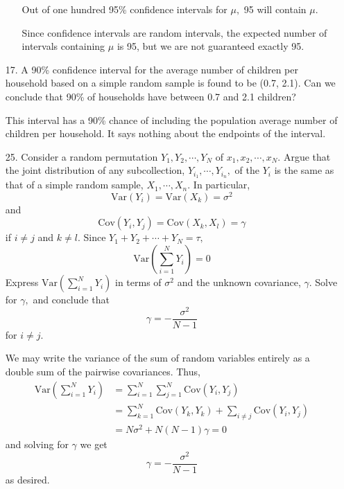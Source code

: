 \documentclass{article}
\newcommand{\var}{\mathrm{Var}}
\newcommand{\cov}{\mathrm{Cov}}
\begin{document}
\begin{itemize}
\begin{enumerate}[a.]
			\ii Out of one hundred 95\% confidence intervals for $\mu,$ 95 will contain $\mu.$
			\begin{answer*}
				 Since confidence intervals are random intervals, the expected number of intervals containing $\mu$ is 95, but we are not guaranteed exactly 95.
			\end{answer*}
		\end{enumerate}

	\item[17.] A 90\% confidence interval for the average number of children per household based on a simple random sample is found to be (0.7, 2.1). Can we conclude that 90\% of households have between 0.7 and 2.1 children?
		\begin{answer*}
			 This interval has a 90\% chance of including the population average number of children per household. It says nothing about the endpoints of the interval.
		\end{answer*}


	\newpage

	\item[25.] Consider a random permutation $Y_1, Y_2, \cdots, Y_N$ of $x_1, x_2, \cdots, x_N.$ Argue that the joint distribution of any subcollection, $Y_{i_1}, \cdots, Y_{i_n},$ of the $Y_i$ is the same as that of a simple random sample, $X_1,\cdots, X_n.$ In particular, \[\var(Y_i)=\var(X_k) = \sigma^2\] and \[\cov(Y_i, Y_j)=\cov(X_k, X_l)=\gamma\] if $i\neq j$ and $k\neq l.$ Since $Y_1+Y_2+\cdots+Y_N=\tau,$ \[\var\left( \sum_{i=1}^N Y_i \right) = 0\] Express $\displaystyle\var\left( \sum_{i=1}^N Y_i \right)$ in terms of $\sigma^2$ and the unknown covariance, $\gamma.$ Solve for $\gamma,$ and conclude that \[\gamma=-\frac{\sigma^2}{N-1}\] for $i\neq j.$
		\begin{soln}
			We may write the variance of the sum of random variables entirely as a double sum of the pairwise covariances. Thus, 
			\begin{align*}
				\var\left( \sum_{i=1}^N Y_i \right) &= \sum_{i=1}^N \sum_{j=1}^N \cov(Y_i, Y_j) \\
				&= \sum_{k=1}^N \cov(Y_k, Y_k) + \sum_{i\neq j} \cov(Y_i, Y_j) \\
				&= N\sigma^2 + N(N-1)\gamma = 0
			\end{align*} and solving for $\gamma$ we get \[\gamma=-\frac{\sigma^2}{N-1}\] as desired.

		\end{soln}


	\newpage


\end{itemize}
\end{document}
